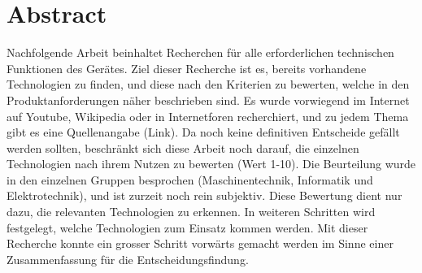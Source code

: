 \section{Abstract}
Nachfolgende Arbeit beinhaltet Recherchen für alle erforderlichen technischen Funktionen des Gerätes. Ziel dieser Recherche ist es, bereits vorhandene Technologien zu finden, und diese nach den Kriterien zu bewerten, welche in den Produktanforderungen näher beschrieben sind. Es wurde vorwiegend im Internet auf Youtube, Wikipedia oder in Internetforen recherchiert, und zu jedem Thema gibt es eine Quellenangabe (Link). Da noch keine definitiven Entscheide gefällt werden sollten, beschränkt sich diese Arbeit noch darauf, die einzelnen Technologien nach ihrem Nutzen zu bewerten (Wert 1-10). Die Beurteilung wurde in den einzelnen Gruppen besprochen (Maschinentechnik, Informatik und Elektrotechnik), und ist zurzeit noch rein subjektiv. Diese Bewertung dient nur dazu, die relevanten Technologien zu erkennen. In weiteren Schritten wird festgelegt, welche Technologien zum Einsatz kommen werden. Mit dieser Recherche konnte ein grosser Schritt vorwärts gemacht werden im Sinne einer Zusammenfassung für die Entscheidungsfindung.